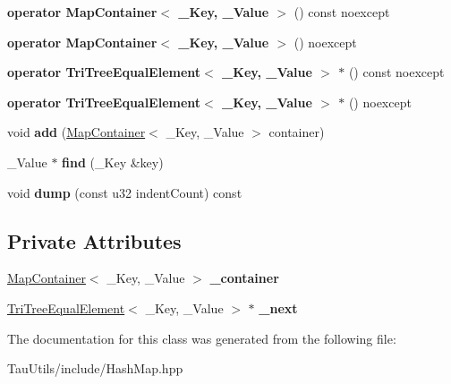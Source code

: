 \begin{DoxyCompactItemize}
{\bfseries operator Map\+Container$<$ \+\_\+\+Key, \+\_\+\+Value $>$} () const noexcept
\item 
\mbox{\label{class_tri_tree_equal_element_a6dd08ca1a858baf48fc551e96c6acf47}} 
{\bfseries operator Map\+Container$<$ \+\_\+\+Key, \+\_\+\+Value $>$} () noexcept
\item 
\mbox{\label{class_tri_tree_equal_element_af8d41506917eea2aa09ca83cbc3a62bf}} 
{\bfseries operator Tri\+Tree\+Equal\+Element$<$ \+\_\+\+Key, \+\_\+\+Value $>$ $\ast$} () const noexcept
\item 
\mbox{\label{class_tri_tree_equal_element_ad5493c22551f127d02fd70427dd2840c}} 
{\bfseries operator Tri\+Tree\+Equal\+Element$<$ \+\_\+\+Key, \+\_\+\+Value $>$ $\ast$} () noexcept
\item 
\mbox{\label{class_tri_tree_equal_element_a3a0451bb13933fac3d57ed54372830d8}} 
void {\bfseries add} (\mbox{\hyperlink{struct_map_container}{Map\+Container}}$<$ \+\_\+\+Key, \+\_\+\+Value $>$ container)
\item 
\mbox{\label{class_tri_tree_equal_element_a61bc53f44f36d1d2a3bf79bbe5039f0d}} 
\+\_\+\+Value $\ast$ {\bfseries find} (\+\_\+\+Key \&key)
\item 
\mbox{\label{class_tri_tree_equal_element_a72b95df3344dc7f24cc975271026e95b}} 
void {\bfseries dump} (const u32 indent\+Count) const
\end{DoxyCompactItemize}
\subsection*{Private Attributes}
\begin{DoxyCompactItemize}
\item 
\mbox{\label{class_tri_tree_equal_element_a7c23071d130cf4a7ba96591593e7229e}} 
\mbox{\hyperlink{struct_map_container}{Map\+Container}}$<$ \+\_\+\+Key, \+\_\+\+Value $>$ {\bfseries \+\_\+container}
\item 
\mbox{\label{class_tri_tree_equal_element_a72a46af19bc0aa60206b2ebf1672f1f6}} 
\mbox{\hyperlink{class_tri_tree_equal_element}{Tri\+Tree\+Equal\+Element}}$<$ \+\_\+\+Key, \+\_\+\+Value $>$ $\ast$ {\bfseries \+\_\+next}
\end{DoxyCompactItemize}


The documentation for this class was generated from the following file\+:\begin{DoxyCompactItemize}
\item 
Tau\+Utils/include/Hash\+Map.\+hpp\end{DoxyCompactItemize}
